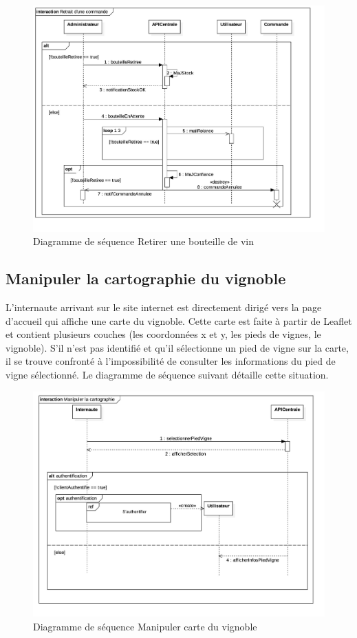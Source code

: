 \documentclass[a4paper, title]{report}
\begin{document}
\begin{figure}
\centering
\includegraphics{Images/SequenceDiagramRetirerBouteille.jpg}
\caption{Diagramme de séquence Retirer une bouteille de vin}
\end{figure}

\subsection{Manipuler la cartographie du vignoble}\label{manipuler-la-cartographie-du-vignoble}

L'internaute arrivant sur le site internet est directement dirigé vers
la page d'accueil qui affiche une carte du vignoble. Cette carte est
faite à partir de Leaflet et contient plusieurs couches (les coordonnées
x et y, les pieds de vignes, le vignoble). S'il n'est pas identifié et
qu'il sélectionne un pied de vigne sur la carte, il se trouve confronté
à l'impossibilité de consulter les informations du pied de vigne
sélectionné. Le diagramme de séquence suivant détaille cette situation.

\begin{figure}
\centering
\includegraphics{Images/SequenceDiagramManipulerCarte.jpg}
\caption{Diagramme de séquence Manipuler carte du vignoble}
\end{figure}
\end{document}
